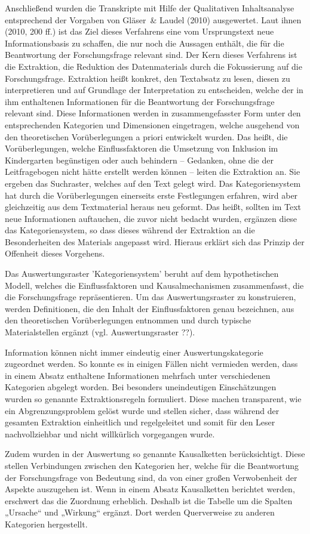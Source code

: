 Anschließend wurden die Transkripte mit Hilfe der Qualitativen Inhaltsanalyse entsprechend der Vorgaben von Gläser~\& Laudel (2010) ausgewertet. Laut ihnen (2010, 200 ff.) ist das Ziel dieses Verfahrens eine vom Ursprungstext neue Informationsbasis zu schaffen, die nur noch die Aussagen enthält, die für die Beantwortung der Forschungsfrage relevant sind. Der Kern dieses Verfahrens ist die Extraktion, die Reduktion des Datenmaterials durch die Fokussierung auf die Forschungsfrage. Extraktion heißt konkret, den Textabsatz zu lesen, diesen zu interpretieren und auf Grundlage der Interpretation zu entscheiden, welche der in ihm enthaltenen Informationen für die Beantwortung der Forschungsfrage relevant sind. Diese Informationen werden in zusammengefasster Form unter den entsprechenden Kategorien und Dimensionen eingetragen, welche ausgehend von den theoretischen Vorüberlegungen a priori entwickelt wurden. Das heißt, die Vorüberlegungen, welche Einflussfaktoren die Umsetzung von Inklusion im Kindergarten begünstigen oder auch behindern -- Gedanken, ohne die der Leitfragebogen nicht hätte erstellt werden können -- leiten die Extraktion an. Sie ergeben das Suchraster, welches auf den Text gelegt wird. Das Kategoriensystem hat durch die Vorüberlegungen einerseits erste Festlegungen erfahren, wird aber gleichzeitig aus dem Textmaterial heraus neu geformt. Das heißt, sollten im Text neue Informationen auftauchen, die zuvor nicht bedacht wurden, ergänzen diese das Kategoriensystem, so dass dieses während der Extraktion an die Besonderheiten des Materials angepasst wird. Hieraus erklärt sich das Prinzip der Offenheit dieses Vorgehens. 

Das Auswertungsraster ’Kategoriensystem’ beruht auf dem hypothetischen Modell, welches die Einflussfaktoren und Kausalmechanismen zusammenfasst, die die Forschungsfrage repräsentieren. Um das Auswertungsraster zu konstruieren, werden Definitionen, die den Inhalt der Einflussfaktoren genau bezeichnen, aus den theoretischen Vorüberlegungen entnommen und durch typische Materialstellen ergänzt (vgl. Auswertungsraster ??). 

Information können nicht immer eindeutig einer Auswertungskategorie zugeordnet werden. So konnte es in einigen Fällen nicht vermieden werden, dass in einem Absatz enthaltene Informationen mehrfach unter verschiedenen Kategorien abgelegt worden. Bei besonders uneindeutigen Einschätzungen wurden so genannte Extraktionsregeln formuliert. Diese machen transparent, wie ein Abgrenzungsproblem gelöst wurde und stellen sicher, dass während der gesamten Extraktion einheitlich und regelgeleitet und somit für den Leser nachvollziehbar und nicht willkürlich vorgegangen wurde. 

Zudem wurden in der Auswertung so genannte Kausalketten berücksichtigt. Diese stellen Verbindungen zwischen den Kategorien her, welche für die Beantwortung der Forschungsfrage von Bedeutung sind, da von einer großen Verwobenheit der Aspekte auszugehen ist. Wenn in einem Absatz Kausalketten berichtet werden, erschwert das die Zuordnung erheblich. Deshalb ist die Tabelle um die Spalten „Ursache“ und „Wirkung“ ergänzt. Dort werden Querverweise zu anderen Kategorien hergestellt.


     
 
